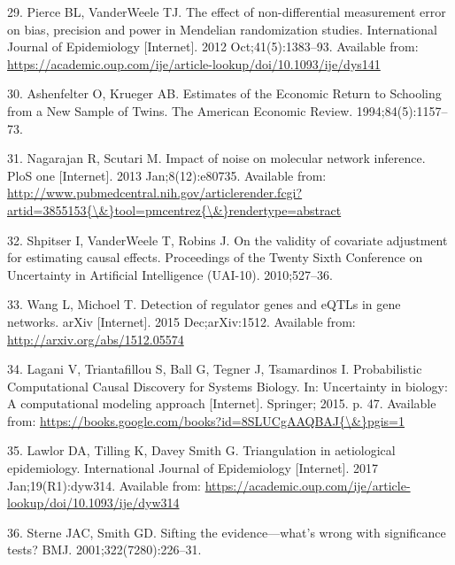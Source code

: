 \documentclass[]{article}
\begin{document}
\hypertarget{ref-Pierce2012}{}
29. Pierce BL, VanderWeele TJ. The effect of non-differential
measurement error on bias, precision and power in Mendelian
randomization studies. International Journal of Epidemiology
{[}Internet{]}. 2012 Oct;41(5):1383--93. Available from:
\url{https://academic.oup.com/ije/article-lookup/doi/10.1093/ije/dys141}

\hypertarget{ref-Ashenfelter1994}{}
30. Ashenfelter O, Krueger AB. Estimates of the Economic Return to
Schooling from a New Sample of Twins. The American Economic Review.
1994;84(5):1157--73.

\hypertarget{ref-Nagarajan2013}{}
31. Nagarajan R, Scutari M. Impact of noise on molecular network
inference. PloS one {[}Internet{]}. 2013 Jan;8(12):e80735. Available
from:
\href{http://www.pubmedcentral.nih.gov/articlerender.fcgi?artid=3855153\%7B/\&\%7Dtool=pmcentrez\%7B/\&\%7Drendertype=abstract}{http://www.pubmedcentral.nih.gov/articlerender.fcgi?artid=3855153\{\textbackslash{}\&\}tool=pmcentrez\{\textbackslash{}\&\}rendertype=abstract}

\hypertarget{ref-Shpitser2010}{}
32. Shpitser I, VanderWeele T, Robins J. On the validity of covariate
adjustment for estimating causal effects. Proceedings of the Twenty
Sixth Conference on Uncertainty in Artificial Intelligence (UAI-10).
2010;527--36.

\hypertarget{ref-Wang2015}{}
33. Wang L, Michoel T. Detection of regulator genes and eQTLs in gene
networks. arXiv {[}Internet{]}. 2015 Dec;arXiv:1512. Available from:
\url{http://arxiv.org/abs/1512.05574}

\hypertarget{ref-Lagani2015}{}
34. Lagani V, Triantafillou S, Ball G, Tegner J, Tsamardinos I.
Probabilistic Computational Causal Discovery for Systems Biology. In:
Uncertainty in biology: A computational modeling approach
{[}Internet{]}. Springer; 2015. p. 47. Available from:
\href{https://books.google.com/books?id=8SLUCgAAQBAJ\%7B/\&\%7Dpgis=1}{https://books.google.com/books?id=8SLUCgAAQBAJ\{\textbackslash{}\&\}pgis=1}

\hypertarget{ref-Lawlor2017}{}
35. Lawlor DA, Tilling K, Davey Smith G. Triangulation in aetiological
epidemiology. International Journal of Epidemiology {[}Internet{]}. 2017
Jan;19(R1):dyw314. Available from:
\url{https://academic.oup.com/ije/article-lookup/doi/10.1093/ije/dyw314}

\hypertarget{ref-Sterne2001}{}
36. Sterne JAC, Smith GD. Sifting the evidence---what's wrong with
significance tests? BMJ. 2001;322(7280):226--31.
\end{document}
